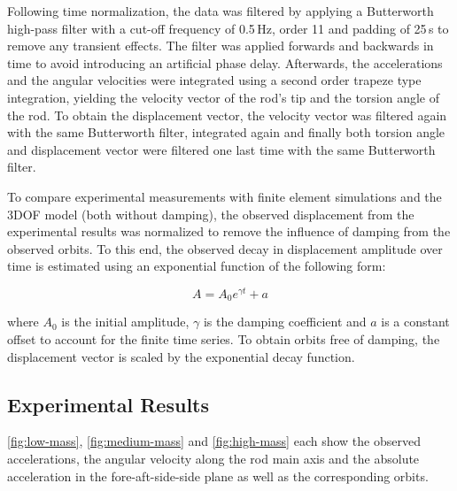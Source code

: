 \documentclass{article}
\begin{document}
Following time normalization, the data was filtered by applying a Butterworth high-pass filter with a cut-off frequency of 0.5\,Hz, order 11 and padding of 25\,s to remove any transient effects. The filter was applied forwards and backwards in time to avoid introducing an artificial phase delay. Afterwards, the accelerations and the angular velocities were integrated using a second order trapeze type integration, yielding the velocity vector of the rod's tip and the torsion angle of the rod. To obtain the displacement vector, the velocity vector was filtered again with the same Butterworth filter, integrated again and finally both torsion angle and displacement vector were filtered one last time with the same Butterworth filter.

To compare experimental measurements with finite element simulations and the 3DOF model (both without damping), the observed displacement from the experimental results was normalized to remove the influence of damping from the observed orbits. To this end, the observed decay in displacement amplitude over time is estimated using an exponential function of the following form:

\begin{equation}
    A = A_0 e ^ {\gamma t} + a
\end{equation}

where $A_0$ is the initial amplitude, $\gamma$ is the damping coefficient and $a$ is a constant offset to account for the finite time series. To obtain orbits free of damping, the displacement vector is scaled by the exponential decay function. 

\subsection{Experimental Results}

\autoref{fig:low-mass}, \autoref{fig:medium-mass} and \autoref{fig:high-mass} each show the observed accelerations, the angular velocity along the rod main axis and the absolute acceleration in the fore-aft-side-side plane as well as the corresponding orbits.

\end{document}
